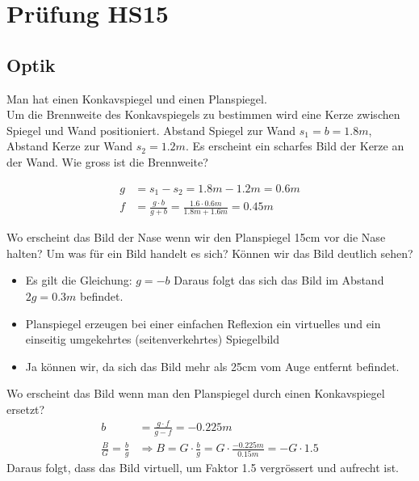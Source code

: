 \section{Prüfung HS15}
\subsection{Optik}

Man hat einen Konkavspiegel und einen Planspiegel.\\
Um die Brennweite des Konkavspiegels zu bestimmen wird eine Kerze zwischen Spiegel und Wand positioniert. Abstand Spiegel zur Wand $s_1 = b = 1.8m$, Abstand Kerze zur Wand $s_2 = 1.2m$. Es erscheint ein scharfes Bild der Kerze an der Wand. Wie gross ist die Brennweite?

\begin{align*}
g&= s_1-s_2 = 1.8m-1.2m = 0.6m\\
f&=\frac{g\cdot b}{g+b} = \frac{1.6\cdot 0.6m}{1.8m+1.6m}=0.45m
\end{align*}

Wo erscheint das Bild der Nase wenn wir den Planspiegel 15cm vor die Nase halten? Um was für ein Bild handelt es sich? Können wir das Bild deutlich sehen?

\begin{itemize}
	\itemsep0em
	\item Es gilt die Gleichung: $g=-b$ Daraus folgt das sich das Bild im Abstand $2g = 0.3m$ befindet.
	\item Planspiegel erzeugen bei einer einfachen Reflexion ein virtuelles und ein einseitig umgekehrtes (seitenverkehrtes) Spiegelbild
	\item Ja können wir, da sich das Bild mehr als 25cm vom Auge entfernt befindet.
\end{itemize}

Wo erscheint das Bild wenn man den Planspiegel durch einen Konkavspiegel ersetzt?
\begin{align*}
	b &= \frac{g\cdot f}{g-f} = -0.225m\\
	\frac{B}{G} = \frac{b}{g} &\Rightarrow B = G\cdot \frac{b}{g} = G\cdot \frac{-0.225m}{0.15m} = -G\cdot 1.5
\end{align*}
Daraus folgt, dass das Bild virtuell, um Faktor 1.5 vergrössert und aufrecht ist.

